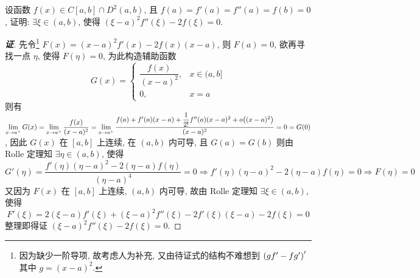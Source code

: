 \begin{example}
    设函数 $f(x)\in C[a,b]\cap D^2(a,b)$, 且 $f(a)=f'(a)=f''(a)=f(b)=0$, 证明: $\exists \xi\in(a,b)$, 使得 $(\xi-a)^2f''(\xi)-2f(\xi)=0.$
\end{example}
\begin{proof}[{\songti \textbf{证}}]
    先令\footnote{因为缺少一阶导项, 故考虑人为补充, 又由待证式的结构不难想到 $\qty(gf'-fg')'$ 其中 $g=(x-a)^2$.} $F(x)=(x-a)^2f'(x)-2f(x)(x-a)$, 则 $F(a)=0$, 欲再寻找一点 $\eta$, 使得 $F(\eta)=0$, 为此构造辅助函数
    $$G(x)=\begin{cases}
            \dfrac{f(x)}{(x-a)^2}, & x\in(a,b] \\
            0,                     & x=a
        \end{cases}$$
    则有 $\displaystyle\lim_{x\to a^+}G(x)=\lim_{x\to a^+}\dfrac{f(x)}{(x-a)^2} =\lim_{x\to a^+}\dfrac{f(a)+f'(a)(x-a)+\dfrac{1}{2!}f''(a)(x-a)^2+o\qty((x-a)^2)}{(x-a)^2}=0=G(0)$, 
    因此 $G(x)$ 在 $[a,b]$ 上连续, 在 $(a,b)$ 内可导, 且 $G(a)=G(b)$ 则由 Rolle 定理知
    $\exists\eta\in(a,b)$, 使得 $$G'(\eta)=\dfrac{f'(\eta)(\eta-a)^2-2(\eta-a)f(\eta)}{(\eta-a)^4}=0\Rightarrow f'(\eta)(\eta-a)^2-2(\eta-a)f(\eta)=0\Rightarrow F(\eta)=0$$
    又因为 $F(x)$ 在 $[a,b]$ 上连续, $(a,b)$ 内可导, 故由 Rolle 定理知 $\exists\xi\in(a,b)$, 使得 $$F'(\xi)=2(\xi-a)f'(\xi)+(\xi-a)^2f''(\xi)-2f'(\xi)(\xi-a)-2f(\xi)=0$$
    整理即得证 $(\xi-a)^2f''(\xi)-2f(\xi)=0.$
\end{proof}
